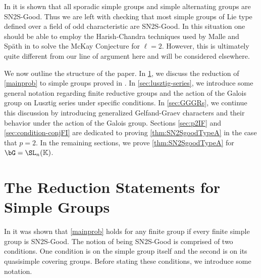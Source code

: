 \documentclass[eqthmnum, nocolour]{jt-calcs}
\begin{document}
\begin{pa}
In \cite{schaeffer-fry:2015:odd-degree-characters} it is shown that all sporadic simple groups and simple alternating groups are SN2S-Good. Thus we are left with checking that most simple groups of Lie type defined over a field of odd characteristic are SN2S-Good. In this situation one should be able to employ the Harish-Chandra techniques used by Malle and Sp\"ath in \cite{malle-spath:2015:mckay2} to solve the McKay Conjecture for $\ell=2$. However, this is ultimately quite different from our line of argument here and will be considered elsewhere.
\end{pa}

\begin{pa}
We now outline the structure of the paper.  In \cref{sec:SimpleStatements}, we discuss the reduction of \cref{mainprob} to simple groups proved in \cite{schaeffer-fry:2015:odd-degree-characters}.  In \cref{sec:lusztig-series}, we introduce some general notation regarding finite reductive groups and the action of the Galois group on Lusztig series under specific conditions.  In \cref{sec:GGGRs}, we continue this discussion by introducing generalized Gelfand-Graev characters and their behavior under the action of the Galois group.  Sections \ref{sec:p2IF} and \ref{sec:condition-conjFI} are dedicated to proving \cref{thm:SN2SgoodTypeA} in the case that $p=2$.  In the remaining sections, we prove \cref{thm:SN2SgoodTypeA} for $\bG=\SL_n(\mathbb{K})$. 
\end{pa}

\section{The Reduction Statements for Simple Groups}\label{sec:SimpleStatements}
\begin{pa}
In \cite{schaeffer-fry:2015:odd-degree-characters} it was shown that \cref{mainprob} holds for any finite group if every finite simple group is SN2S-Good. The notion of being SN2S-Good is comprised of two conditions. One condition is on the simple group itself and the second is on its quasisimple covering groups. Before stating these conditions, we introduce some notation.
\end{pa}
\end{document}
